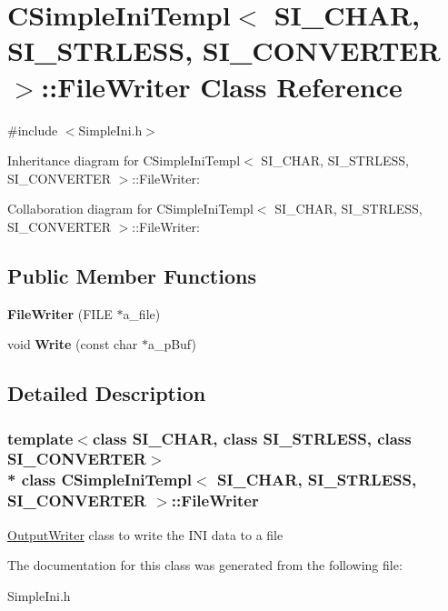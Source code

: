 \hypertarget{classCSimpleIniTempl_1_1FileWriter}{}\section{C\+Simple\+Ini\+Templ$<$ S\+I\+\_\+\+C\+H\+AR, S\+I\+\_\+\+S\+T\+R\+L\+E\+SS, S\+I\+\_\+\+C\+O\+N\+V\+E\+R\+T\+ER $>$\+:\+:File\+Writer Class Reference}
\label{classCSimpleIniTempl_1_1FileWriter}


{\ttfamily \#include $<$Simple\+Ini.\+h$>$}



Inheritance diagram for C\+Simple\+Ini\+Templ$<$ S\+I\+\_\+\+C\+H\+AR, S\+I\+\_\+\+S\+T\+R\+L\+E\+SS, S\+I\+\_\+\+C\+O\+N\+V\+E\+R\+T\+ER $>$\+:\+:File\+Writer\+:


Collaboration diagram for C\+Simple\+Ini\+Templ$<$ S\+I\+\_\+\+C\+H\+AR, S\+I\+\_\+\+S\+T\+R\+L\+E\+SS, S\+I\+\_\+\+C\+O\+N\+V\+E\+R\+T\+ER $>$\+:\+:File\+Writer\+:
\subsection*{Public Member Functions}
\begin{DoxyCompactItemize}
\item 
{\bfseries File\+Writer} (F\+I\+LE $\ast$a\+\_\+file)\hypertarget{classCSimpleIniTempl_1_1FileWriter_aecd4d79480c9b4e70b598c10014856f8}{}\label{classCSimpleIniTempl_1_1FileWriter_aecd4d79480c9b4e70b598c10014856f8}

\item 
void {\bfseries Write} (const char $\ast$a\+\_\+p\+Buf)\hypertarget{classCSimpleIniTempl_1_1FileWriter_ae8885b97884ef9dd5bf074bc4f011373}{}\label{classCSimpleIniTempl_1_1FileWriter_ae8885b97884ef9dd5bf074bc4f011373}

\end{DoxyCompactItemize}


\subsection{Detailed Description}
\subsubsection*{template$<$class S\+I\+\_\+\+C\+H\+AR, class S\+I\+\_\+\+S\+T\+R\+L\+E\+SS, class S\+I\+\_\+\+C\+O\+N\+V\+E\+R\+T\+ER$>$\\*
class C\+Simple\+Ini\+Templ$<$ S\+I\+\_\+\+C\+H\+A\+R, S\+I\+\_\+\+S\+T\+R\+L\+E\+S\+S, S\+I\+\_\+\+C\+O\+N\+V\+E\+R\+T\+E\+R $>$\+::\+File\+Writer}

\hyperlink{classCSimpleIniTempl_1_1OutputWriter}{Output\+Writer} class to write the I\+NI data to a file 

The documentation for this class was generated from the following file\+:\begin{DoxyCompactItemize}
\item 
Simple\+Ini.\+h\end{DoxyCompactItemize}
